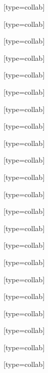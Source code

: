 \author[24]{K.,~Wu}[type=collab]

\author[42]{Q.,~Wu}[type=collab]

\author[36]{A.,~Wyżykowski}[type=collab]

\author[27]{H.,~Xu}[type=collab]

\author[39]{J.,~Yang}[type=collab]

\author[18]{R.,~Yang}[type=collab]

\author[39]{M.,~Yao}[type=collab]

\author[32]{Z.,~Yin}[type=collab]

\author[47]{I.,~Yoo}[type=collab]

\author[36]{W.,~Zabołotny}[type=collab]

\author[43]{H.P.,~Zbroszczyk}[type=collab]

\author[32]{X.,~Zhang}[type=collab]

\author[5]{X.,~Zhang}[type=collab]

\author[5]{S.,~Zharko}[type=collab]

\author[24]{S.,~Zheng}[type=collab]

\author[32]{D.,~Zhou}[type=collab]

\author[42]{W.,~Zhou}[type=collab]

\author[5]{Y.,~Zhou}[type=collab]

\author[29]{X.,~Zhu}[type=collab]

\author[10]{G.,~Zischka}[type=collab]

\author[34]{W.,~Zubrzycka}[type=collab]

\author[5]{P.,~Zumbruch}[type=collab]

